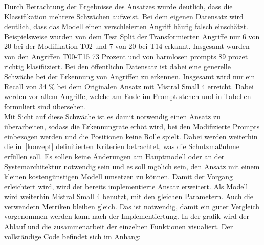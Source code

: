 Durch Betrachtung der Ergebnisse des Ansatzes wurde deutlich, dass die Klassifikation mehrere Schwächen aufweist. Bei dem eigenen Datensatz wird deutlich, dass
das Modell einen verschleierten Angriff häufig falsch einschätzt. Beispielsweise wurden von dem Test Split der Transformierten Angriffe nur 6 von 20 bei 
der Modifikation T02 und 7 von 20 bei T14 erkannt. Insgesamt wurden von den Angriffen T00-T15 73 Prozent und von harmlosen prompts 89 prozet richtig klasifiiziert.
Bei den öffentlichn Datensatz ist dabei eine generelle Schwäche bei der Erkennung von Angriffen zu erkennen. Insgesamt wird nur ein Recall von 34 \% bei dem 
Originalen Ansatz mit Mistral Small 4 erreicht. Dabei werden vor allem Angriffe, welche am Ende im Prompt stehen und in Tabellen formuliert sind übersehen. \\
Mit Sicht auf diese Schwäche ist es damit notwendig einen Ansatz zu überarbeiten, sodass die Erkennungrate erhöt wird, bei den
Modifizierte Prompts einbezogen werden und die Positionen keine Rolle spielt. Dabei werden weiterhin die in~\ref{konzept} definitierten 
Kriterien betrachtet, was die Schutzmaßnhme erfüllen soll. Es sollen keine Änderungen am Hauptmodell oder an der Systemarchitektur
notwendig sein und es soll mgölich sein, den Ansatz mit einem kleinen kostengünstigen Modell umsetzen zu können. Damit der 
Vorgang erleichtert wird, wird der bereits implementierte Ansatz erweitert. Als Modell wird weiterhin Mistral Small 4 benutzt,
mit den gleichen Parametern. Auch die verwendetn Metriken bleiben gleich. Das ist notwendig, damit ein guter Vergleich 
vorgenommen werden kann nach der Implementiertung. In der grafik wird der Ablauf und die zusammenarbeit der einzelnen 
Funktionen visualiert. Der vollständige Code befindet sich im Anhang: \\


